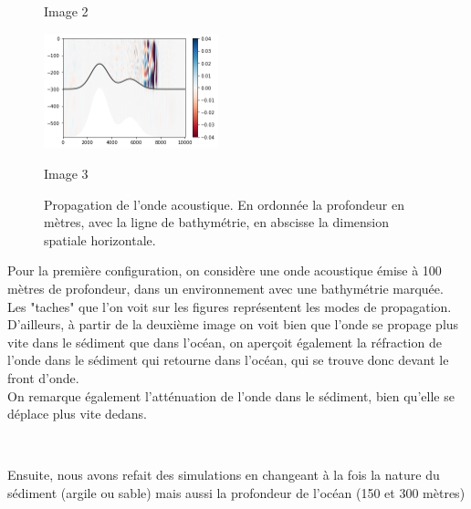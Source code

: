 \documentclass{rapportECC}
\begin{document}
\begin{figure}[H]
\begin{minipage}{0.45\textwidth}
        \caption{Image 2}
        \label{fig:image2}
    \end{minipage}
    \vspace{1cm} %
    \begin{minipage}{0.9\textwidth}
        \centering
        \includegraphics[width=0.45\textwidth]{images/im6.png}
        \caption{Image 3}
        \label{fig:image3}
    \end{minipage}
    \caption{Propagation de l'onde acoustique. En ordonnée la profondeur en mètres, avec la ligne de bathymétrie, en abscisse la dimension spatiale horizontale.}
    \label{fig:three_images}
\end{figure}
Pour la première configuration, on considère une onde acoustique émise à 100 mètres de profondeur, dans un environnement avec une bathymétrie marquée. \\
Les "taches" que l'on voit sur les figures représentent les modes de propagation. \\
D'ailleurs, à  partir de la deuxième image on voit bien que l'onde se propage plus vite dans le sédiment que dans l'océan, on aperçoit également la réfraction de l'onde dans le sédiment qui retourne dans l'océan, qui se trouve donc devant le front d'onde.\\
On remarque également l'atténuation de l'onde dans le sédiment, bien qu'elle se déplace plus vite dedans.

\\
\vspace{1 cm}

Ensuite, nous avons refait des simulations en changeant à la fois la nature du sédiment (argile ou sable) mais aussi la profondeur de l'océan (150 et 300 mètres)
\end{document}
